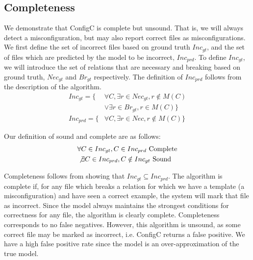 
\subsection{Completeness}

We demonstrate that ConfigC is complete but unsound.
That is, we will always detect a misconfiguration, but may also report correct files as misconfigurations.
We first define the set of incorrect files based on ground truth $Inc_{gt}$, and the set of files which are predicted by the model to be incorrect, $Inc_{prd}$.
To define $Inc_{gt}$, we will introduce the set of relations that are necessary and breaking based on ground truth, $Nec_{gt}$ and $Br_{gt}$ respectively.
The definition of $Inc_{prd}$ follows from the description of the algorithm.
%
\begin{align}
Inc_{gt} = \{&\forall C, \exists r \in Nec_{gt}, r \notin M(C)\\ \nonumber
 &\lor \exists r \in Br_{gt}, r \in M(C)\} \\
Inc_{prd} = \{&\forall C, \exists r \in Nec, r \notin M(C)\}
\end{align}

Our definition of sound and complete are as follows:
%
\begin{align}
&\forall C \in Inc_{gt}, C \in Inc_{prd} \text{  Complete} \\
&\not \exists C \in Inc_{prd}, C \notin Inc_{gt} \text{  Sound}
\end{align}

Completeness follows from showing that $Inc_{gt} \subseteq Inc_{prd}$.
The algorithm is complete if, for any file which breaks a relation for which we have a template (a misconfiguration) and have seen a correct example, the system will mark that file as incorrect.
Since the model always maintains the strongest conditions for correctness for any file, the algorithm is clearly complete.
Completeness corresponds to no false negatives.
However, this algorithm is unsound, as some correct file may be marked as incorrect, i.e. ConfigC returns a false positive.
We have a high false positive rate since the model is an over-approximation of the true model.
